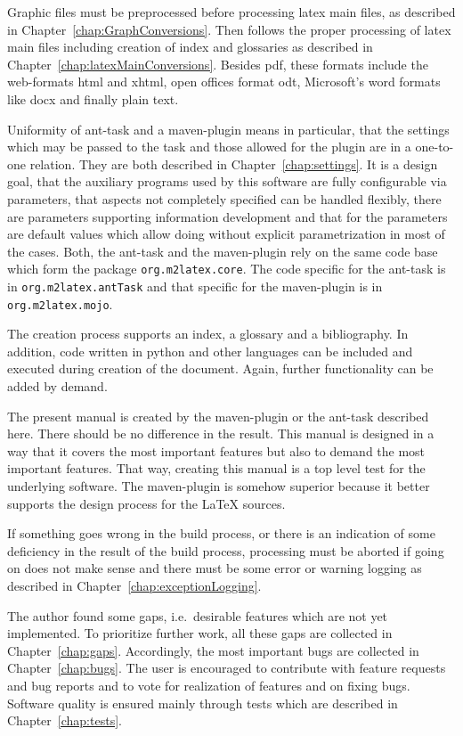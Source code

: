 Graphic files must be preprocessed before processing latex main files, 
as described in Chapter~\ref{chap:GraphConversions}. 
Then follows the proper processing of latex main files 
including creation of index and glossaries 
as described in Chapter~\ref{chap:latexMainConversions}. 
Besides \gls{pdf}, these formats include the web-formats \gls{html} 
and \gls{xhtml}, 
open offices format \gls{odt}, Microsoft's word formats like \gls{docx} 
and finally plain text. 

Uniformity of ant-task and a maven-plugin means in particular, 
that the settings which may be passed to the task 
and those allowed for the plugin are in a one-to-one relation. 
They are both described in Chapter~\ref{chap:settings}. 
It is a design goal, that the auxiliary programs 
used by this software are fully configurable via parameters, 
that aspects not completely specified can be handled flexibly, 
there are parameters supporting information development 
and that for the parameters are default values 
which allow doing without explicit parametrization in most of the cases.%
Both, the ant-task and the maven-plugin rely on the same code base 
which form the package \texttt{org.m2latex.core}. 
The code specific for the ant-task is in \texttt{org.m2latex.antTask} 
and that specific for the maven-plugin is in \texttt{org.m2latex.mojo}. 


The creation process supports an index, a glossary and a bibliography. 
In addition, code written in python and other languages can be included and executed 
during creation of the document. 
Again, further functionality can be added by demand. 

The present manual is created by the maven-plugin or the ant-task 
described here. 
There should be no difference in the result. 
This manual is designed in a way that it covers the most important features 
but also to demand the most important features. 
That way, creating this manual is a top level test 
for the underlying software. 
The maven-plugin is somehow superior 
because it better supports the design process for the \LaTeX{} sources. 

If something goes wrong in the build process, 
or there is an indication 
of some deficiency in the result of the build process, 
processing must be aborted if going on does not make sense 
and there must be some error or warning logging 
as described in Chapter~\ref{chap:exceptionLogging}. 

The author found some gaps, i.e.~desirable features 
which are not yet implemented. 
To prioritize further work, 
all these gaps are collected in Chapter~\ref{chap:gaps}. 
Accordingly, the most important bugs are collected in
Chapter~\ref{chap:bugs}. 
The user is encouraged to contribute with feature requests 
and bug reports and to vote for realization of features 
and on fixing bugs. 
Software quality is ensured mainly through tests 
which are described in Chapter~\ref{chap:tests}. 

